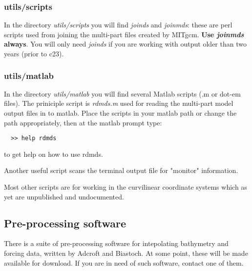 \subsubsection{utils/scripts}

In the directory {\em utils/scripts} you will find {\em joinds} and {\em joinmds}:
these are perl scripts used from joining the multi-part files created by
MITgcm. {\bf Use {\em joinmds} always}. You will only need {\em joinds} if you
are working with output older than two years (prior to c23).

\subsubsection{utils/matlab}

In the directory {\em utils/matlab} you will find several Matlab scripts
(.m or dot-em files). The priniciple script is {\em rdmds.m} used for reading
the multi-part model output files in to matlab. Place the scripts in your
matlab path or change the path appropriately, then at the matlab prompt type:
\begin{verbatim}
  >> help rdmds
\end{verbatim}
to get help on how to use rdmds.

Another useful script scans the terminal output file for "monitor" information.

Most other scripts are for working in the curvilinear coordinate systems which
as yet are unpublished and undocumented.

\subsection{Pre-processing software}

There is a suite of pre-processing software for intepolating bathymetry
and forcing data, written by Adcroft and Biastoch. At some point,
these will be made available for download. If you are in need of such
software, contact one of them.
